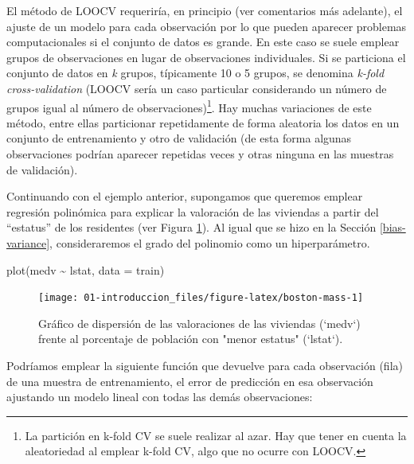 \documentclass[
]{book}
\newenvironment{Shaded}{\begin{snugshade}}{\end{snugshade}}
\newcommand{\AttributeTok}[1]{\textcolor[rgb]{0.77,0.63,0.00}{#1}}
\newcommand{\FunctionTok}[1]{\textcolor[rgb]{0.00,0.00,0.00}{#1}}
\newcommand{\NormalTok}[1]{#1}
\newcommand{\SpecialCharTok}[1]{\textcolor[rgb]{0.00,0.00,0.00}{#1}}
\theoremstyle{break}
\theoremstyle{definition}
\theoremstyle{definition}
\theoremstyle{definition}
\theoremstyle{definition}
\theoremstyle{remark}
\begin{document}
El método de LOOCV requeriría, en principio (ver comentarios más adelante), el ajuste de un modelo para cada observación por lo que pueden aparecer problemas computacionales si el conjunto de datos es grande.
En este caso se suele emplear grupos de observaciones en lugar de observaciones individuales.
Si se particiona el conjunto de datos en \emph{k} grupos, típicamente 10 o 5 grupos, se denomina \emph{k-fold cross-validation} (LOOCV sería un caso particular considerando un número de grupos igual al número de observaciones)\footnote{La partición en k-fold CV se suele realizar al azar. Hay que tener en cuenta la aleatoriedad al emplear k-fold CV, algo que no ocurre con LOOCV.}.
Hay muchas variaciones de este método, entre ellas particionar repetidamente de forma aleatoria los datos en un conjunto de entrenamiento y otro de validación (de esta forma algunas observaciones podrían aparecer repetidas veces y otras ninguna en las muestras de validación).

Continuando con el ejemplo anterior, supongamos que queremos emplear regresión polinómica para explicar la valoración de las viviendas a partir del ``estatus'' de los residentes (ver Figura \ref{fig:boston-mass}).
Al igual que se hizo en la Sección \ref{bias-variance}, consideraremos el grado del polinomio como un hiperparámetro.

\begin{Shaded}
\begin{Highlighting}[]
\FunctionTok{plot}\NormalTok{(medv }\SpecialCharTok{\textasciitilde{}}\NormalTok{ lstat, }\AttributeTok{data =}\NormalTok{ train)}
\end{Highlighting}
\end{Shaded}

\begin{figure}[!htb]

{\centering \texttt{[image: 01-introduccion\_files/figure-latex/boston-mass-1]} 

}

\caption{Gráfico de dispersión de las valoraciones de las viviendas (`medv`) frente al porcentaje de población con "menor estatus" (`lstat`).}\label{fig:boston-mass}
\end{figure}

Podríamos emplear la siguiente función que devuelve para cada observación (fila) de una muestra de entrenamiento, el error de predicción en esa observación ajustando un modelo lineal con todas las demás observaciones:
\end{document}
